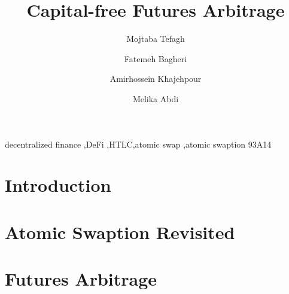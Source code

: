 \documentclass[review]{elsarticle}
\begin{document}
\begin{frontmatter}

\title{Capital-free Futures Arbitrage}


\author[mysecondaryaddress]{Mojtaba Tefagh}

\author[mymainaddress]{Fatemeh Bagheri } 

\author[mymainaddress]{Amirhossein Khajehpour }

\author[mythirdaddress]{Melika Abdi }

\address[mysecondaryaddress]{ Department of Mathematical Sciences, Sharif University of Technology}
\address[mymainaddress]{ Department of Computer Engineering, Sharif University of Technology}
\address[mythirdaddress]{ Department of Electrical Engineering, Sharif University of Technology}

\begin{abstract}

\end{abstract}

\begin{keyword}
decentralized finance \sep DeFi \sep HTLC\sep atomic swap \sep atomic swaption
\MSC[2010] 93A14
\end{keyword}

\end{frontmatter}


\linenumbers
\section{Introduction}

\section{Atomic Swaption Revisited}

\section{Futures Arbitrage}

\end{document}
